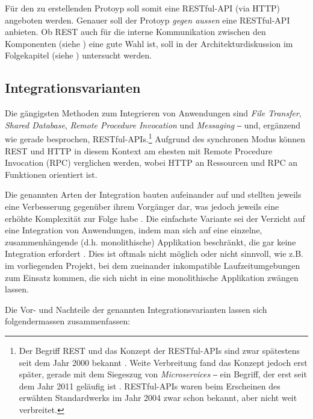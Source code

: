 Für den zu erstellenden Protoyp soll somit eine RESTful-API (via HTTP) angeboten werden. Genauer soll der Protoyp \textit{gegen aussen} eine RESTful-API anbieten. Ob REST auch für die interne Kommunikation zwischen den Komponenten (siehe ) eine gute Wahl ist, soll in der Architekturdiskussion im Folgekapitel (siehe ) untersucht werden.

\subsection{Integrationsvarianten}
\label{sec:integrationsvarianten}

Die gängigsten Methoden zum Integrieren von Anwendungen sind \textit{File Transfer}, \textit{Shared Database}, \textit{Remote Procedure Invocation} und \textit{Messaging} \cite[Introduction, S. xxx]{enterprise-integration-patterns} ‒ und, ergänzend wie gerade besprochen, RESTful-APIs.\footnote{Der Begriff REST und das Konzept der RESTful-APIs sind zwar spätestens seit dem Jahr 2000 bekannt \cite[Kapitel 6]{fielding2000}. Weite Verbreitung fand das Konzept jedoch erst später, gerade mit dem Siegeszug von \textit{Microservices} ‒ ein Begriff, der erst seit dem Jahr 2011 geläufig ist \cite{leanix-microservices}. RESTful-APIs waren beim Erscheinen des erwähten Standardwerks im Jahr 2004 zwar schon bekannt, aber nicht weit verbreitet.} Aufgrund des synchronen Modus können REST und HTTP in diesem Kontext am ehesten mit Remote Procedure Invocation (RPC) verglichen werden, wobei HTTP an Ressourcen und RPC an Funktionen orientiert ist.

Die genannten Arten der Integration bauten aufeinander auf und stellten jeweils eine Verbesserung gegenüber ihrem Vorgänger dar, was jedoch jeweils eine erhöhte Komplexität zur Folge habe \cite[S. 41-42]{enterprise-integration-patterns}. Die einfachste Variante sei der Verzicht auf eine Integration von Anwendungen, indem man sich auf eine einzelne, zusammenhängende (d.h. monolithische) Applikation beschränkt, die gar keine Integration erfordert \cite[S. 39]{enterprise-integration-patterns}. Dies ist oftmals nicht möglich oder nicht sinnvoll, wie z.B. im vorliegenden Projekt, bei dem zueinander inkompatible Laufzeitumgebungen zum Einsatz kommen, die sich nicht in eine monolithische Applikation zwängen lassen. 

Die Vor- und Nachteile der genannten Integrationsvarianten lassen sich folgendermassen zusammenfassen:

